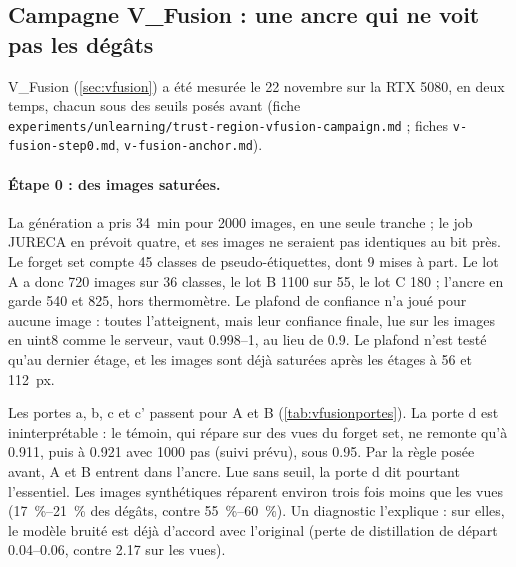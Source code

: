 \documentclass[11pt,a4paper]{article}
\newcommand{\chemin}[1]{\nolinkurl{#1}}%
\begin{document}
\subsection{Campagne V\_Fusion : une ancre qui ne voit pas les dégâts}\label{sec:campagnevfusion}
V\_Fusion (\cref{sec:vfusion}) a été mesurée le 22 novembre sur la RTX 5080, en deux temps, chacun
sous des seuils posés avant (fiche \chemin{experiments/unlearning/trust-region-vfusion-campaign.md} ;
fiches \chemin{v-fusion-step0.md}, \chemin{v-fusion-anchor.md}).

\paragraph{Étape 0 : des images saturées.} La génération a pris \SI{34}{\minute} pour 2000 images, en
une seule tranche ; le job JURECA en prévoit quatre, et ses images ne seraient pas identiques au bit
près. Le forget set compte 45 classes de pseudo-étiquettes, dont 9 mises à part. Le lot A a donc
720 images sur 36 classes, le lot B 1100 sur 55, le lot C 180 ; l'ancre en garde 540 et 825, hors
thermomètre. Le plafond de confiance n'a joué pour aucune image : toutes l'atteignent, mais leur
confiance finale, lue sur les images en uint8 comme le serveur, vaut \numrange{0.998}{1}, au lieu de
\num{0.9}. Le plafond n'est testé qu'au dernier étage, et les images sont déjà saturées après les
étages à 56 et \SI{112}{px}.

Les portes a, b, c et c' passent pour A et B (\cref{tab:vfusionportes}). La porte d est
ininterprétable : le témoin, qui répare sur des vues du forget set, ne remonte qu'à \num{0.911}, puis
à \num{0.921} avec 1000 pas (suivi prévu), sous \num{0.95}. Par la règle posée avant, A et B entrent
dans l'ancre. Lue sans seuil, la porte d dit pourtant l'essentiel. Les images synthétiques réparent
environ trois fois moins que les vues (\SIrange{17}{21}{\percent} des dégâts, contre
\SIrange{55}{60}{\percent}). Un diagnostic l'explique : sur elles, le modèle bruité est déjà d'accord
avec l'original (perte de distillation de départ \numrange{0.04}{0.06}, contre \num{2.17} sur les
vues).
\end{document}
